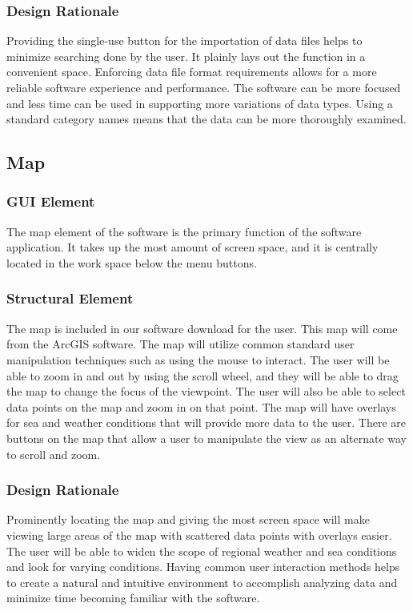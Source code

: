 \documentclass[onecolumn, draftclsnofoot,10pt, compsoc]{IEEEtran}
\begin{document}
\begin{singlespace}
        \subsubsection{Design Rationale}
        Providing the single-use button for the importation of data files helps to minimize searching done by the user.  It plainly lays out the function in a convenient space. Enforcing data file format requirements allows for a more reliable software experience and performance.  The software can be more focused and less time can be used in supporting more variations of data types.  Using a standard category names means that the data can be more thoroughly examined. 
    \subsection{Map}
        \subsubsection{GUI Element}
        The map element of the software is the primary function of the software application.  It takes up the most amount of screen space, and it is centrally located in the work space below the menu buttons.
        \subsubsection{Structural Element}
        The map is included in our software download for the user.  This map will come from the ArcGIS software.  The map will utilize common standard user manipulation techniques such as using the mouse to interact.  The user will be able to zoom in and out by using the scroll wheel, and they will be able to drag the map to change the focus of the viewpoint.  The user will also be able to select data points on the map and zoom in on that point.  The map will have overlays for sea and weather conditions that will provide more data to the user. There are buttons on the map that allow a user to manipulate the view as an alternate way to scroll and zoom.
        \subsubsection{Design Rationale}
        Prominently locating the map and giving the most screen space will make viewing large areas of the map with scattered data points with overlays easier.  The user will be able to widen the scope of regional weather and sea conditions and look for varying conditions.  Having common user interaction methods helps to create a natural and intuitive environment to accomplish analyzing data and minimize time becoming familiar with the software.

\end{singlespace}
\end{document}
